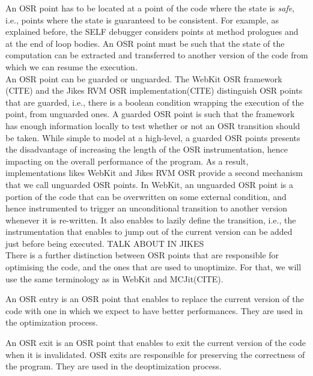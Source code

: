 An OSR point has to be located at a point of the code where the state is \textit{safe}, i.e., points where the state is guaranteed to be consistent.
For example, as explained before, the SELF debugger considers points at method prologues and at the end of loop bodies.
An OSR point must be such that the state of the computation can be extracted and transferred to another version of the code from which we can resume the execution.\\

An OSR point can be guarded or unguarded.
The WebKit OSR framework (CITE) and the Jikes RVM OSR implementation(CITE) distinguish OSR points that are guarded, i.e., there is a boolean condition wrapping the execution of the point, from unguarded ones.
A guarded OSR point is such that the framework has enough information locally to test whether or not an OSR transition should be taken.
While simple to model at a high-level, a guarded OSR points presents the disadvantage of increasing the length of the OSR instrumentation, hence impacting on the overall performance of the program.
As a result, implementations likes WebKit and Jikes RVM OSR provide a second mechanism that we call unguarded OSR points.
In WebKit, an unguarded OSR point is a portion of the code that can be overwritten on some external condition, and hence instrumented to trigger an unconditional transition to another version whenever it is re-written.
It also enables to lazily define the transition, i.e., the instrumentation that enables to jump out of the current version can be added just before being executed.
TALK ABOUT IN JIKES\\

There is a further distinction between OSR points that are responsible for optimising the code, and the ones that are used to unoptimize.
For that, we will use the same terminology as in WebKit and MCJit(CITE).
\begin{definition}\label{OSREntryDefinition}
An OSR entry is an OSR point that enables to replace the current version of the code with one in which we expect to have better performances.
They are used in the optimization process.
\end{definition}

\begin{definition}
An OSR exit is an OSR point that enables to exit the current version of the code when it is invalidated.
OSR exits are responsible for preserving the correctness of the program.
They are used in the deoptimization process.
\end{definition}

